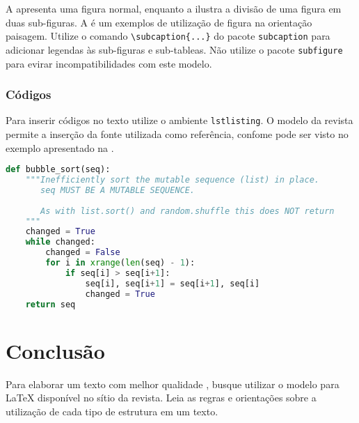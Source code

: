 \documentclass{textolivre}
\begin{document}
A  apresenta uma figura normal, enquanto 
a  ilustra a divisão de uma figura em duas sub-figuras. 
A  é um exemplos de utilização de figura na orientação paisagem.
Utilize o comando \verb|\subcaption{...}| do pacote \texttt{subcaption} para adicionar legendas 
às sub-figuras e sub-tableas. Não utilize o pacote \texttt{subfigure} para evirar incompatibilidades com este modelo.


\lipsum[10-14]



\subsubsection{Códigos}\label{sec-codigos}
Para inserir códigos no texto utilize o ambiente \texttt{lstlisting}. 
O modelo da revista permite a inserção da fonte utilizada como referência, confome 
pode ser visto no exemplo apresentado na .
 
\begin{lstlisting}[language=python, label=lst-code, caption={\emph{Bubble sort}, ou ordenação por flutuação.}, source={Rosetta Code (\url{https://rosettacode.org/wiki/Sorting_algorithms/Bubble_sort}).}]
def bubble_sort(seq):
    """Inefficiently sort the mutable sequence (list) in place.
       seq MUST BE A MUTABLE SEQUENCE.
 
       As with list.sort() and random.shuffle this does NOT return 
    """
    changed = True
    while changed:
        changed = False
        for i in xrange(len(seq) - 1):
            if seq[i] > seq[i+1]:
                seq[i], seq[i+1] = seq[i+1], seq[i]
                changed = True
    return seq
\end{lstlisting} %



\lipsum[20-21]


\section{Conclusão}\label{sec-conclusao}
Para elaborar um texto com melhor qualidade \cite{donaldknuth1984,leslielamport1994,araujo2020}, busque utilizar o modelo para \LaTeX{} 
disponível no sítio da revista. Leia as regras e orientações sobre a utilização de cada tipo de estrutura em um texto.


\lipsum[17-19]
\end{document}
